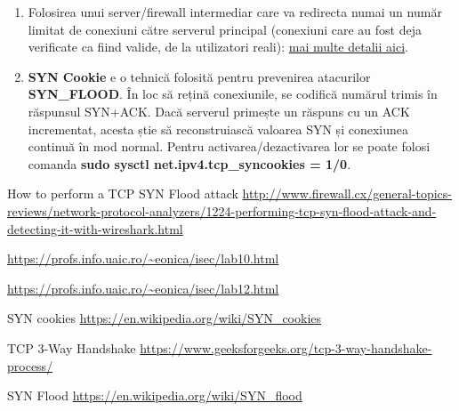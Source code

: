 \documentclass[a4paper]{article}
\begin{document}
\begin{enumerate}
    \item Folosirea unui server/firewall intermediar care va redirecta numai un număr limitat de conexiuni către serverul principal (conexiuni care au fost deja verificate ca fiind valide, de la utilizatori reali): \href{https://www.youtube.com/watch?v=nYPFH1ZAlck&ab_channel=CBTNuggets}{mai multe detalii aici}.

    \item \textbf{SYN Cookie} e o tehnică folosită pentru prevenirea atacurilor \textbf{SYN\_FLOOD}. În loc să rețină conexiunile, se codifică numărul trimis în răspunsul SYN+ACK. Dacă serverul primește un răspuns cu un ACK incrementat, acesta știe să reconstruiască valoarea SYN și conexiunea continuă în mod normal. Pentru activarea/dezactivarea lor se poate folosi comanda \textbf{sudo sysctl net.ipv4.tcp\_syncookies = 1/0}.
    
\end{enumerate}

\begin{thebibliography}{9}
		
	    How to perform a TCP SYN Flood attack
	    \url{http://www.firewall.cx/general-topics-reviews/network-protocol-analyzers/1224-performing-tcp-syn-flood-attack-and-detecting-it-with-wireshark.html}

        \url{https://profs.info.uaic.ro/~eonica/isec/lab10.html}
    
        \url{https://profs.info.uaic.ro/~eonica/isec/lab12.html}

        SYN cookies
        \url{https://en.wikipedia.org/wiki/SYN_cookies}

        TCP 3-Way Handshake
        \url{https://www.geeksforgeeks.org/tcp-3-way-handshake-process/}

        SYN Flood
        \url{https://en.wikipedia.org/wiki/SYN_flood}

\end{thebibliography}
\end{document}
